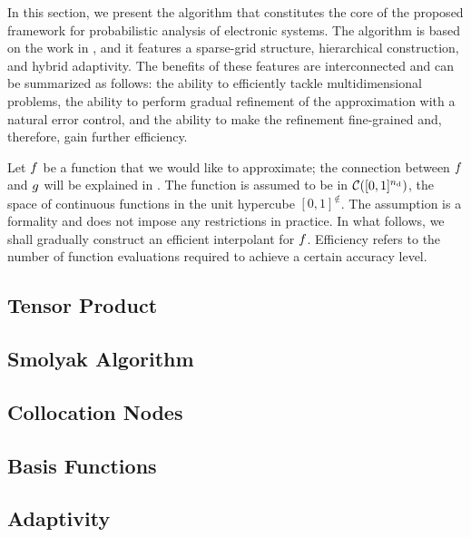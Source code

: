 In this section, we present the algorithm that constitutes the core of the
proposed framework for probabilistic analysis of electronic systems.
 The algorithm is based on the work in \cite{jakeman2012,
klimke2006, ma2009}, and it features a sparse-grid structure, hierarchical
construction, and hybrid adaptivity. The benefits of these features are
interconnected and can be summarized as follows: the ability to efficiently
tackle multidimensional problems, the ability to perform gradual refinement of
the approximation with a natural error control, and the ability to make the
refinement fine-grained and, therefore, gain further efficiency.

Let $f$ be a function that we would like to approximate; the connection between
$f$ and $g$ will be explained in . The function is assumed to
be in $\mathcal{C}([0, 1]^{n_\text{d}})$, the space of continuous functions in the unit
hypercube $[0, 1]^\nin$. The assumption is a formality and does not impose any
restrictions in practice. In what follows, we shall gradually construct an
efficient interpolant for $f$. Efficiency refers to the number of function
evaluations required to achieve a certain accuracy level.

\subsection{Tensor Product} 


\subsection{Smolyak Algorithm} 



\subsection{Collocation Nodes} 



\subsection{Basis Functions} 


\subsection{Adaptivity} 


